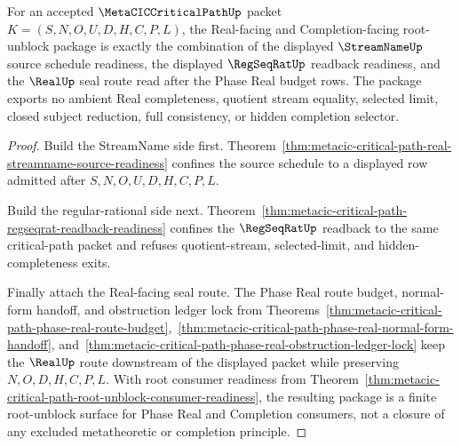 \begin{theorem}
\label{thm:metacic-critical-path-real-completion-readiness}
For an accepted $\MetaCICCriticalPathUp$ packet $K=(S,N,O,U,D,H,C,P,L)$, the Real-facing and Completion-facing root-unblock package is exactly the combination of the displayed $\StreamNameUp$ source schedule readiness, the displayed $\RegSeqRatUp$ readback readiness, and the $\RealUp$ seal route read after the Phase Real budget rows. The package exports no ambient Real completeness, quotient stream equality, selected limit, closed subject reduction, full consistency, or hidden completion selector.
\end{theorem}
\begin{proof}
Build the StreamName side first. Theorem~\ref{thm:metacic-critical-path-real-streamname-source-readiness} confines the source schedule to a displayed row admitted after $S,N,O,U,D,H,C,P,L$.

Build the regular-rational side next. Theorem~\ref{thm:metacic-critical-path-regseqrat-readback-readiness} confines the $\RegSeqRatUp$ readback to the same critical-path packet and refuses quotient-stream, selected-limit, and hidden-completeness exits.

Finally attach the Real-facing seal route. The Phase Real route budget, normal-form handoff, and obstruction ledger lock from Theorems~\ref{thm:metacic-critical-path-phase-real-route-budget},~\ref{thm:metacic-critical-path-phase-real-normal-form-handoff}, and~\ref{thm:metacic-critical-path-phase-real-obstruction-ledger-lock} keep the $\RealUp$ route downstream of the displayed packet while preserving $N,O,D,H,C,P,L$. With root consumer readiness from Theorem~\ref{thm:metacic-critical-path-root-unblock-consumer-readiness}, the resulting package is a finite root-unblock surface for Phase Real and Completion consumers, not a closure of any excluded metatheoretic or completion principle.
\end{proof}

